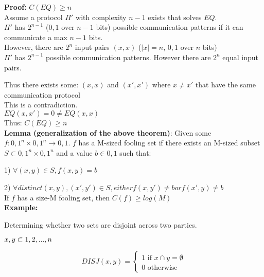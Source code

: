 \documentclass[12pt]{article}
\begin{document}
\textbf{Proof:} $C(EQ) \geq n$
\\

Assume a protocol $\Pi'$ with complexity $n - 1$ exists that solves $EQ$.
\\

$\Pi'$ has $2^{n - 1}$ (${0, 1}$ over $n - 1$ bits) possible communication patterns if it can communicate a max $n - 1$
bits.
\\

However, there are $2^{n}$ input pairs $(x, x)$ ($|x| = n$, ${0, 1}$ over $n$ bits)
\\

$\Pi'$ has $2^{n - 1}$ possible communication patterns.
However there are $2^{n}$ equal input pairs.

Thus there exists some:
$(x, x)$ and $(x', x')$ where $x \neq x'$ that have the same communication protocol
\\

This is a contradiction.
\\
$EQ(x, x') = 0 \neq EQ(x, x)$
\\

Thus: $C(EQ) \geq n$
\\

\textbf{Lemma (generalization of the above theorem)}: Given some $f : {0, 1}^{n} \times {0, 1}^{n} \rightarrow {0, 1}$. $f$
has a M-sized fooling set if there exists an M-sized subset $S \subset {0, 1}^{n} \times {0, 1}^{n}$ and a value
$b \in {0, 1}$ such that:
\par{1) $\forall (x, y) \in S, f(x, y) = b$}
\par{2) $\forall distinct (x, y), (x', y') \in S, either f(x, y') \neq b or f(x', y) \neq b$}
\\
If $f$ has a size-M fooling set, then $C(f) \geq log(M)$
\\

\textbf{Example:}
\par{Determining whether two sets are disjoint across two parties.}

\par{$x, y \subset {1, 2, ..., n} \\$}
\\
\par{
  \begin{equation}
    DISJ(x, y) =
    \begin{cases}
      1 \text{ if } x \cap y = \emptyset \\
      0 \text{ otherwise}
    \end{cases}
  \end{equation}
}
\end{document}
